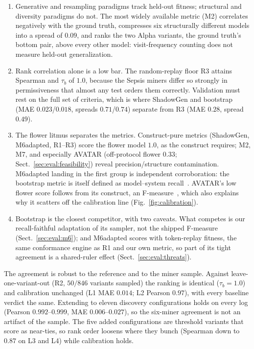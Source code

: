 \documentclass[runningheads]{llncs}
\newcommand{\chg}[1]{#1}
\begin{document}
\begin{enumerate}
  \item Generative and resampling paradigms track held-out fitness; structural and diversity paradigms do not. The most widely available metric (M2) correlates negatively with the ground truth, compresses six structurally different models into a spread of \chg{$0.09$}, and \chg{ranks the two Alpha variants, the ground truth's bottom pair, above every other model}: visit-frequency counting does not measure held-out generalization.
  \item Rank correlation alone is a low bar. The random-replay floor R3 attains Spearman and $\tau_b$ of $1.0$, because the Sepsis miners differ so strongly in permissiveness that almost any test orders them correctly. Validation must rest on the full set of criteria, which is where \chg{ShadowGen} and bootstrap (MAE $0.023$/\chg{$0.018$}, spreads $0.71$/$0.74$) separate from R3 (MAE $0.28$, spread $0.49$).
  \item The flower litmus separates the metrics. Construct-pure metrics (\chg{ShadowGen}, M6adapted, R1--R3) score the flower model $1.0$, as the construct requires; M2, M7, and \chg{especially AVATAR (off-protocol flower $0.33$; Sect.~\ref{sec:eval:feasibility})} reveal precision/structure contamination. M6adapted landing in the first group is independent corroboration: the bootstrap metric is itself defined as model--system recall~\cite{polyvyanyy2022bootstrap}. \chg{AVATAR's} low flower score follows from its construct, an F-measure~\cite{theis2020avatar}, which also explains \chg{why it scatters off the calibration line (Fig.~\ref{fig:calibration})}.
  \item Bootstrap is the closest competitor, with two caveats. What competes is our recall-faithful adaptation of its sampler, not the shipped F-measure (Sect.~\ref{sec:eval:m6}); and M6adapted scores with token-replay fitness, the same conformance engine as R1 and our own metric, so part of its tight agreement is a shared-ruler effect (Sect.~\ref{sec:eval:threats}).
\end{enumerate}

The agreement is robust to the reference and to the miner sample. Against leave-one-variant-out (R2\chg{, $50/846$ variants sampled}) the ranking is identical ($\tau_b{=}1.0$) and calibration unchanged (L1 MAE $0.014$; L2 Pearson $0.97$), with every baseline verdict the same. \chg{Extending to eleven discovery configurations holds on every log (Pearson $0.992$--$0.999$, MAE $0.006$--$0.027$), so the six-miner agreement is not an artifact of the sample. The five added configurations are threshold variants that score as near-ties, so rank order loosens where they bunch (Spearman down to $0.87$ on L3 and L4) while calibration holds.}
\end{document}
